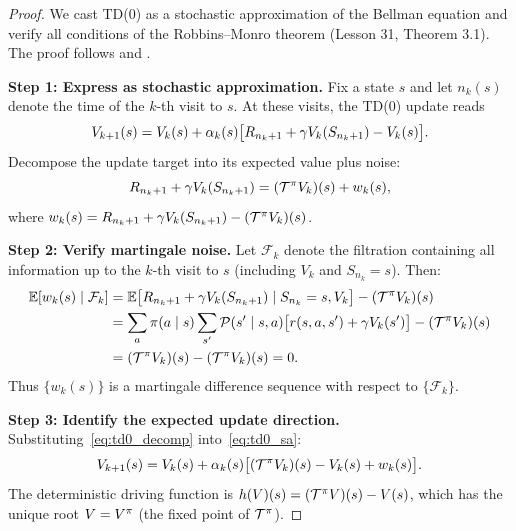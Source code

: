 \documentclass[11pt,a4paper]{article}
\begin{document}
\begin{proof}
We cast TD(0) as a stochastic approximation of the Bellman equation and
verify all conditions of the Robbins--Monro theorem
(Lesson 31, Theorem 3.1). The proof follows
\citet{tsitsiklis1994} and \citet{jaakkola1994}.

\textbf{Step 1: Express as stochastic approximation.}
Fix a state $s$ and let $n_k(s)$ denote the time of the $k$-th visit
to $s$. At these visits, the TD(0) update reads
\begin{equation}
  V_{k+1}(s) = V_k(s) + \alpha_k(s)\bigl[R_{n_k+1}
  + \gamma V_k(S_{n_k+1}) - V_k(s)\bigr].
  \label{eq:td0_sa}
\end{equation}
Decompose the update target into its expected value plus noise:
\begin{equation}
  R_{n_k+1} + \gamma V_k(S_{n_k+1})
  = (\mathcal{T}^\pi V_k)(s) + w_k(s),
  \label{eq:td0_decomp}
\end{equation}
where $w_k(s) = R_{n_k+1} + \gamma V_k(S_{n_k+1})
- (\mathcal{T}^\pi V_k)(s)$.

\textbf{Step 2: Verify martingale noise.}
Let $\mathcal{F}_k$ denote the filtration containing all information
up to the $k$-th visit to $s$ (including $V_k$ and $S_{n_k} = s$).
Then:
\begin{align}
  \mathbb{E}[w_k(s) \mid \mathcal{F}_k]
  &= \mathbb{E}\bigl[R_{n_k+1} + \gamma V_k(S_{n_k+1})
     \mid S_{n_k} = s, V_k\bigr]
     - (\mathcal{T}^\pi V_k)(s) \nonumber\\
  &= \sum_a \pi(a \mid s) \sum_{s'} \mathcal{P}(s' \mid s, a)
     \bigl[r(s,a,s') + \gamma V_k(s')\bigr]
     - (\mathcal{T}^\pi V_k)(s) \nonumber\\
  &= (\mathcal{T}^\pi V_k)(s) - (\mathcal{T}^\pi V_k)(s)
   = 0.
  \label{eq:td0_noise_mg}
\end{align}
Thus $\{w_k(s)\}$ is a martingale difference sequence with respect
to $\{\mathcal{F}_k\}$.

\textbf{Step 3: Identify the expected update direction.}
Substituting~\eqref{eq:td0_decomp} into~\eqref{eq:td0_sa}:
\begin{equation}
  V_{k+1}(s) = V_k(s) + \alpha_k(s)
  \bigl[(\mathcal{T}^\pi V_k)(s) - V_k(s) + w_k(s)\bigr].
  \label{eq:td0_sa_clean}
\end{equation}
The deterministic driving function is
$h(V)(s) = (\mathcal{T}^\pi V)(s) - V(s)$, which has the unique root
$V = V^{\pi}$ (the fixed point of $\mathcal{T}^\pi$).


\end{proof}
\end{document}
